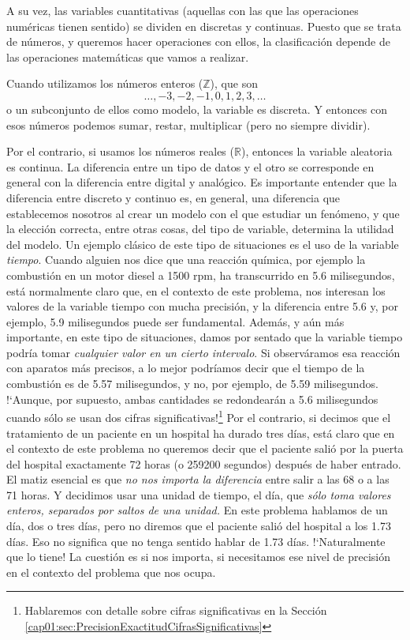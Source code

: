 A su vez, las variables cuantitativas (aquellas con las que las operaciones numéricas tienen sentido) se dividen en  {\sf discretas} y {\sf continuas}. Puesto
que se trata de números, y queremos hacer operaciones con ellos, la
clasificación depende de las operaciones matemáticas que vamos a realizar.

Cuando utilizamos los {\sf números enteros} ($\mathbb Z$), que son
\[\ldots,-3,-2,-1,0,1,2,3,\ldots \]
o un subconjunto de ellos como modelo, la variable es discreta. Y entonces con esos
números podemos sumar, restar, multiplicar (pero no siempre dividir).

Por el contrario, si usamos {\sf los números reales} ($\mathbb R$),
entonces la variable aleatoria es continua. La diferencia entre un tipo de datos
y el otro se corresponde en general con la diferencia entre digital y analógico.
Es importante entender que la diferencia entre discreto y continuo es,
en general, una diferencia que establecemos nosotros al crear un {\sf
modelo} con el que estudiar un fenómeno, y que la elección correcta, entre otras cosas, del tipo de variable, determina la
utilidad del modelo. Un ejemplo clásico de este tipo de situaciones es el uso de la variable {\em tiempo}. Cuando alguien nos dice que una
reacción química, por ejemplo la combustión en un motor diesel a 1500 rpm, ha transcurrido en 5.6 milisegundos, está normalmente claro que, en el
contexto de este problema, nos interesan los valores de la variable tiempo con mucha precisión, y la diferencia entre 5.6 y, por ejemplo, 5.9
milisegundos puede ser fundamental. Además, y aún más importante, en este tipo de situaciones, damos por sentado que la variable tiempo podría tomar
{\em cualquier valor en un cierto intervalo}. Si observáramos esa reacción con aparatos más precisos, a lo mejor podríamos decir que el tiempo de la
combustión es de 5.57 milisegundos, y no, por ejemplo, de 5.59 milisegundos. {!`}Aunque, por supuesto, ambas cantidades se redondearán a 5.6 milisegundos
cuando sólo se usan dos cifras significativas!\footnote{Hablaremos con detalle sobre cifras significativas en la Sección \ref{cap01:sec:PrecisionExactitudCifrasSignificativas}} Por el contrario, si decimos que el tratamiento de un paciente en un hospital ha durado
tres días, está claro que en el contexto de este problema no queremos decir que el paciente salió por la puerta del hospital exactamente 72 horas (o
259200 segundos) después de haber entrado. El matiz esencial es que {\em no nos importa la diferencia} entre salir a las 68 o a las 71 horas. Y
decidimos usar una unidad de tiempo, el día, que {\em sólo toma valores enteros, separados por saltos de una unidad.} En este problema hablamos de un
día, dos o tres días, pero no diremos que el paciente salió del hospital a los 1.73 días. Eso no significa que no tenga sentido hablar de 1.73 días.
{!`}Naturalmente que lo tiene! La  cuestión es si nos importa, si necesitamos ese nivel de precisión en el contexto del problema que nos ocupa.\\


